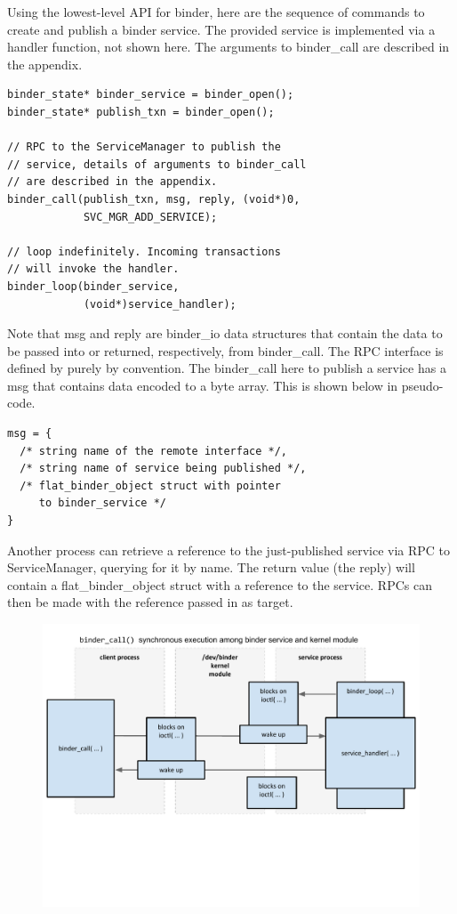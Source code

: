 \documentclass[prodmode]{acmlarge}
\begin{document}
Using the lowest-level API for binder, here are the sequence of commands to create and publish a binder service. The provided service is implemented via a handler function, not shown here. The arguments to binder\_call are described in the appendix.

\begin{Verbatim}[samepage=true]
binder_state* binder_service = binder_open();
binder_state* publish_txn = binder_open();

// RPC to the ServiceManager to publish the
// service, details of arguments to binder_call
// are described in the appendix.
binder_call(publish_txn, msg, reply, (void*)0,
            SVC_MGR_ADD_SERVICE);

// loop indefinitely. Incoming transactions
// will invoke the handler.
binder_loop(binder_service,
            (void*)service_handler);
\end{Verbatim}

Note that msg and reply are binder\_io data structures that contain the data to be passed into or returned, respectively, from binder\_call. The RPC interface is defined by purely by convention. The binder\_call here to publish a service has a msg that contains data encoded to a byte array. This is shown below in pseudo-code.

\begin{Verbatim}[samepage=true]
msg = {
  /* string name of the remote interface */,
  /* string name of service being published */,
  /* flat_binder_object struct with pointer
     to binder_service */
}
\end{Verbatim}

Another process can retrieve a reference to the just-published service via RPC to ServiceManager, querying for it by name. The return value (the reply) will contain a flat\_binder\_object struct with a reference to the service. RPCs can then be made with the reference passed in as target.
\begin{figure}[h]
\centering
\includegraphics[width=\textwidth]{drawings/binder_call.pdf}
\end{figure}
\end{document}
